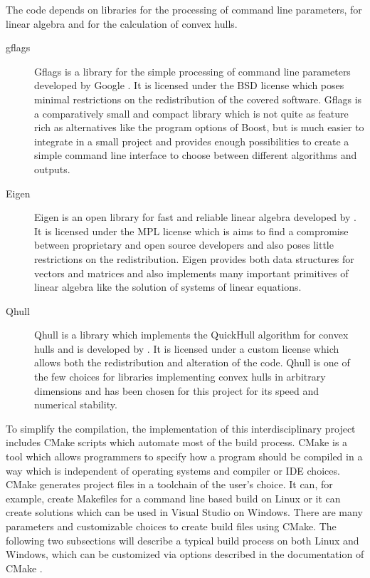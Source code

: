The code depends on libraries for the processing of command line parameters, for linear algebra and for the calculation of convex hulls.
\begin{description}
    \item[gflags]
        Gflags is a library for the simple processing of command line parameters developed by Google \cite{gflags}.
        It is licensed under the BSD license which poses minimal restrictions on the redistribution of the covered software.
        Gflags is a comparatively small and compact library which is not quite as feature rich as alternatives like the program options of Boost, but is much easier to integrate in a small project and provides enough possibilities to create a simple command line interface to choose between different algorithms and outputs.
    \item[Eigen] Eigen is an open library for fast and reliable linear algebra developed by \textcite{eigen}.
        It is licensed under the MPL license which is aims to find a compromise between proprietary and open source developers and also poses little restrictions on the redistribution.
        Eigen provides both data structures for vectors and matrices and also implements many important primitives of linear algebra like the solution of systems of linear equations.
    \item[Qhull] Qhull is a library which implements the QuickHull algorithm for convex hulls and is developed by \textcite{barber1996quickhull}.
        It is licensed under a custom license which allows both the redistribution and alteration of the code.
        Qhull is one of the few choices for libraries implementing convex hulls in arbitrary dimensions and has been chosen for this project for its speed and numerical stability.
\end{description}

To simplify the compilation, the implementation of this interdisciplinary project includes CMake scripts which automate most of the build process.
CMake \cite{cmake} is a tool which allows programmers to specify how a program should be compiled in a way which is independent of operating systems and compiler or IDE choices.
CMake generates project files in a toolchain of the user's choice.
It can, for example, create Makefiles for a command line based build on Linux or it can create solutions which can be used in Visual Studio on Windows.
There are many parameters and customizable choices to create build files using CMake.
The following two subsections will describe a typical build process on both Linux and Windows, which can be customized via options described in the documentation of CMake \cite{cmake-tutorial}.

